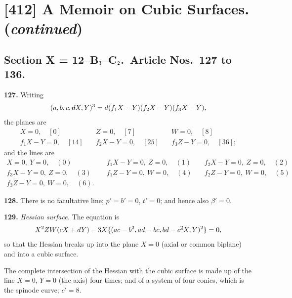 \documentclass[11pt,a4paper]{article}
\theoremstyle{definition}
\begin{document}
\setcounter{page}{423}

\section*{[412] A Memoir on Cubic Surfaces. (\textit{continued})}

\subsection*{Section X = 12--B$_{\mbox{\scriptsize 3}}$--C$_{\mbox{\scriptsize 2}}$.\ Article Nos.\ 127 to 136.}

\noindent\textbf{127.} Writing
\[
(a,b,c,d\!\hbox{\hspace{-0.5em}}\raisebox{0.3ex}{$\scriptstyle\frown$}\!X,Y)^3 = d(f_1X-Y)(f_2X-Y)(f_3X-Y),
\]
the planes are
\[
\begin{array}{lll}
X=0, \quad [0] & \quad Z=0, \quad [7] & \quad W=0, \quad [8] \\
f_1X-Y=0, \quad [14] & \quad f_2X-Y=0, \quad [25] & \quad f_3Z-Y=0, \quad [36];
\end{array}
\]
and the lines are
\[
\begin{array}{lll}
X=0,\ Y=0, \quad (0) & \quad f_1X-Y=0,\ Z=0, \quad (1) & \quad f_2X-Y=0,\ Z=0, \quad (2) \\
f_3X-Y=0,\ Z=0, \quad (3) & \quad f_1Z-Y=0,\ W=0, \quad (4) & \quad f_2Z-Y=0,\ W=0, \quad (5) \\
f_3Z-Y=0,\ W=0, \quad (6). & &
\end{array}
\]

\noindent\textbf{128.} There is no facultative line; $p'=b'=0$, $t'=0$; and hence also $\beta'=0$.

\noindent\textbf{129.} \textit{Hessian surface.} The equation is
\[
X^2ZW(cX+dY) - 3X\{(ac-b^2,ad-bc,bd-c^2\!\hbox{\hspace{-0.5em}}\raisebox{0.3ex}{$\scriptstyle\frown$}\!X,Y)^2\} = 0,
\]
so that the Hessian breaks up into the plane $X=0$ (axial or common biplane) and into a cubic surface.

The complete intersection of the Hessian with the cubic surface is made up of the line $X=0$, $Y=0$ (the axis) four times; and of a system of four conics, which is the spinode curve; $c'=8$.
\end{document}
